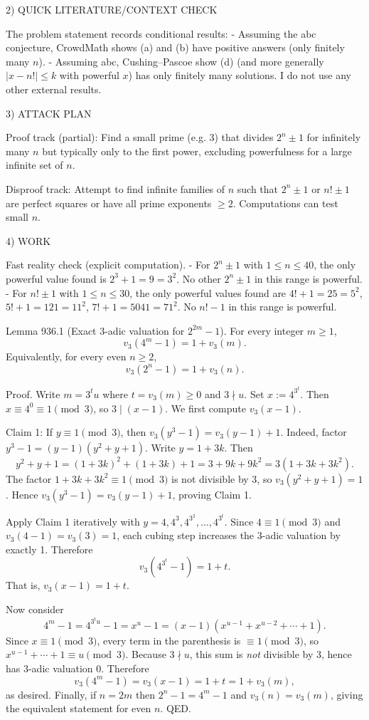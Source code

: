 2) QUICK LITERATURE/CONTEXT CHECK

The problem statement records conditional results:
- Assuming the abc conjecture, CrowdMath shows (a) and (b) have positive answers (only finitely many \(n\)).
- Assuming abc, Cushing--Pascoe show (d) (and more generally \(|x-n!|\le k\) with powerful \(x\)) has only finitely many solutions.
I do not use any other external results.

3) ATTACK PLAN

Proof track (partial): Find a small prime (e.g. \(3\)) that divides \(2^n\pm 1\) for infinitely many \(n\) but typically only to the first power, excluding powerfulness for a large infinite set of \(n\).

Disproof track: Attempt to find infinite families of \(n\) such that \(2^n\pm 1\) or \(n!\pm 1\) are perfect squares or have all prime exponents \(\ge2\). Computations can test small \(n\).

4) WORK

Fast reality check (explicit computation).
- For \(2^n\pm 1\) with \(1\le n\le 40\), the only powerful value found is \(2^3+1=9=3^2\). No other \(2^n\pm 1\) in this range is powerful.
- For \(n!\pm 1\) with \(1\le n\le 30\), the only powerful values found are
\(4!+1=25=5^2\), \(5!+1=121=11^2\), \(7!+1=5041=71^2\). No \(n!-1\) in this range is powerful.

Lemma 936.1 (Exact 3-adic valuation for \(2^{2m}-1\)).
For every integer \(m\ge 1\),
\[v_3(4^{m}-1)=1+v_3(m).\]
Equivalently, for every even \(n\ge 2\),
\[v_3(2^{n}-1)=1+v_3(n).\]

Proof.
Write \(m=3^t u\) where \(t=v_3(m)\ge 0\) and \(3\nmid u\).
Set \(x:=4^{3^t}\). Then \(x\equiv 4^{0}\equiv 1\pmod 3\), so \(3\mid (x-1)\).
We first compute \(v_3(x-1)\).

Claim 1: If \(y\equiv 1\pmod 3\), then \(v_3(y^3-1)=v_3(y-1)+1\).
Indeed, factor \(y^3-1=(y-1)(y^2+y+1)\). Write \(y=1+3k\). Then
\[y^2+y+1=(1+3k)^2+(1+3k)+1 = 3 + 9k + 9k^2 = 3(1+3k+3k^2).
\]
The factor \(1+3k+3k^2\equiv 1\pmod 3\) is not divisible by \(3\), so \(v_3(y^2+y+1)=1\). Hence
\(v_3(y^3-1)=v_3(y-1)+1\), proving Claim 1.

Apply Claim 1 iteratively with \(y=4,4^3,4^{3^2},\dots,4^{3^t}\). Since \(4\equiv 1\pmod 3\) and \(v_3(4-1)=v_3(3)=1\), each cubing step increases the 3-adic valuation by exactly 1. Therefore
\[v_3(4^{3^t}-1)=1+t.\]
That is, \(v_3(x-1)=1+t\).

Now consider
\[4^{m}-1 = 4^{3^t u}-1 = x^{u}-1 = (x-1)(x^{u-1}+x^{u-2}+\cdots+1).
\]
Since \(x\equiv 1\pmod 3\), every term in the parenthesis is \(\equiv 1\pmod 3\), so
\(x^{u-1}+\cdots+1 \equiv u \pmod 3\). Because \(3\nmid u\), this sum is \emph{not} divisible by 3, hence has 3-adic valuation 0. Therefore
\[v_3(4^{m}-1)=v_3(x-1)=1+t=1+v_3(m),
\]
as desired. Finally, if \(n=2m\) then \(2^n-1=4^m-1\) and \(v_3(n)=v_3(m)\), giving the equivalent statement for even \(n\). QED.


